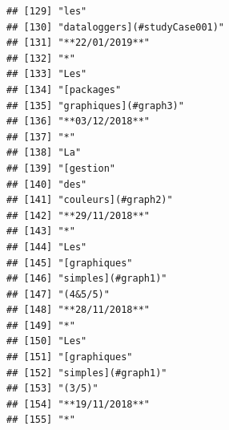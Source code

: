 \documentclass[]{book}
\begin{document}
\begin{verbatim}
## [129] "les"                                                                                    
## [130] "dataloggers](#studyCase001)"                                                            
## [131] "**22/01/2019**"                                                                         
## [132] "*"                                                                                      
## [133] "Les"                                                                                    
## [134] "[packages"                                                                              
## [135] "graphiques](#graph3)"                                                                   
## [136] "**03/12/2018**"                                                                         
## [137] "*"                                                                                      
## [138] "La"                                                                                     
## [139] "[gestion"                                                                               
## [140] "des"                                                                                    
## [141] "couleurs](#graph2)"                                                                     
## [142] "**29/11/2018**"                                                                         
## [143] "*"                                                                                      
## [144] "Les"                                                                                    
## [145] "[graphiques"                                                                            
## [146] "simples](#graph1)"                                                                      
## [147] "(4&5/5)"                                                                                
## [148] "**28/11/2018**"                                                                         
## [149] "*"                                                                                      
## [150] "Les"                                                                                    
## [151] "[graphiques"                                                                            
## [152] "simples](#graph1)"                                                                      
## [153] "(3/5)"                                                                                  
## [154] "**19/11/2018**"                                                                         
## [155] "*"                                                                                      

\end{verbatim}
\end{document}
